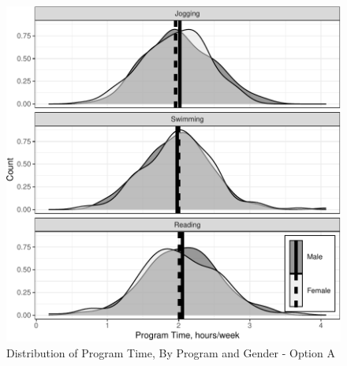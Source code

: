 \documentclass[
]{article}
\begin{document}
\begin{figure}[hb]

\includegraphics{Appendix_ex_weightloss_files/figure-latex/unnamed-chunk-45-1} \hfill{}

\caption{Distribution of Program Time, By Program and Gender - Option A}\label{fig:unnamed-chunk-45}
\end{figure}

\clearpage
\end{document}
